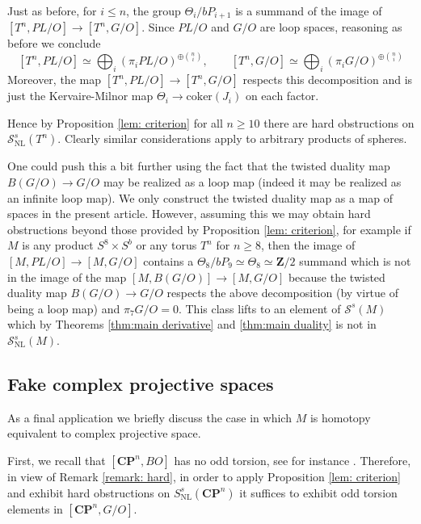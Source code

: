 \documentclass[reqno]{amsart}
\theoremstyle{theorem}
\theoremstyle{remark}
\theoremstyle{definition}
\newcommand{\bC}{\mathbf{C}}
\newcommand{\bZ}{\mathbf{Z}}
\newcommand{\NL}{\mathrm{NL}}
\renewcommand{\SS}{\mathcal{S}}
\begin{document}
Just as before, for $i \leq n$, the group $\Theta_i / bP_{i+1}$ is a summand of the image of $[T^n, PL/O] \to [T^n, G/O]$. Since $PL/O$ and $G/O$ are loop spaces, reasoning as before we conclude
\[ [T^n , PL/O] \simeq  \bigoplus_i (\pi_iPL/O)^{\oplus {n \choose i}} , \qquad [T^n , G/O] \simeq  \bigoplus_i (\pi_i G/O)^{\oplus {n \choose i}} \]  
Moreover, the map $[T^n , PL/O] \to [T^n , G/O]$ respects this decomposition and is just the Kervaire-Milnor map $\Theta_i \to \text{coker}(J_i)$ on each factor.  




Hence by Proposition \ref{lem: criterion}  for all $n \geq 10$ there are hard obstructions on $\SS^s_\NL(T^n)$. Clearly similar considerations apply to arbitrary products of spheres. 


One could push this a bit further using the fact that the twisted duality map $B(G/O) \to G/O$ may be realized as a loop map (indeed it may be realized as an infinite loop map). We only construct the twisted duality map as a map of spaces in the present article. However, assuming this we may obtain hard obstructions beyond those provided by Proposition \ref{lem: criterion}, for example if $M$ is any product $S^8 \times S^b$ or any torus $T^n$ for $n \geq 8$, then the image of $[M,PL/O] \to [M,G/O]$ contains a $\Theta_8/bP_9 \simeq \Theta_8 \simeq \bZ/2$ summand which is not in the image of the map $[M,B(G/O)] \to [M,G/O]$ because the twisted duality map $B(G/O) \to G/O$ respects the above decomposition (by virtue of being a loop map) and $\pi_7G/O=0$. This class lifts to an element of $\SS^s(M)$ which by Theorems \ref{thm:main derivative} and \ref{thm:main duality} is not in $\SS_{\text{NL}}^s(M)$.






\subsection{Fake complex projective spaces}


As a final application we briefly discuss the case in which $M$ is homotopy equivalent to complex projective space.

First, we recall that $[\bC \mathbf{P}^n, BO]$ has no odd torsion, see for instance \cite{F67}. Therefore, in view of Remark \ref{remark: hard}, in order to apply Proposition \ref{lem: criterion} and exhibit hard obstructions on $S^s_{\text{NL} }(\bC \mathbf{P}^n)$  it suffices to exhibit odd torsion elements in $[\bC \mathbf{P}^n, G/O]$. 
\end{document}
